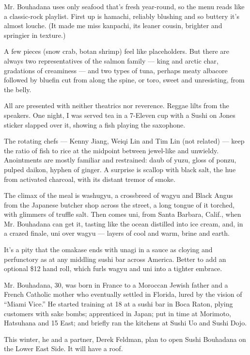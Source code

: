 Mr. Bouhadana uses only seafood that's fresh year-round, so the menu
reads like a classic-rock playlist. First up is hamachi, reliably
blushing and so buttery it's almost louche. (It made me miss kanpachi,
its leaner cousin, brighter and springier in texture.)

A few pieces (snow crab, botan shrimp) feel like placeholders. But there
are always two representatives of the salmon family --- king and arctic
char, gradations of creaminess --- and two types of tuna, perhaps meaty
albacore followed by bluefin cut from along the spine, or toro, sweet
and unresisting, from the belly.

All are presented with neither theatrics nor reverence. Reggae lilts
from the speakers. One night, I was served tea in a 7-Eleven cup with a
Sushi on Jones sticker slapped over it, showing a fish playing the
saxophone.

The rotating chefs --- Kenny Jiang, Weiqi Lin and Tim Lin (not related)
--- keep the ratio of fish to rice at the midpoint between jewel-like
and unwieldy. Anointments are mostly familiar and restrained: daub of
yuzu, gloss of ponzu, pulped daikon, hyphen of ginger. A surprise is
scallop with black salt, the hue from activated charcoal, with its
distant tremor of smoke.

The climax of the meal is washugyu, a crossbreed of wagyu and Black
Angus from the Japanese butcher shop across the street, a long tongue of
it torched, with glimmers of truffle salt. Then comes uni, from Santa
Barbara, Calif., when Mr. Bouhadana can get it, tasting like the ocean
distilled into ice cream, and, in a crazed finale, uni over wagyu ---
layers of cool and warm, brine and earth.

It's a pity that the omakase ends with unagi in a sauce as cloying and
perfunctory as at any middling sushi bar across America. Better to add
an optional \$12 hand roll, which furls wagyu and uni into a tighter
embrace.

Mr. Bouhadana, 30, was born in France to a Moroccan Jewish father and a
French Catholic mother who eventually settled in Florida, lured by the
vision of ``Miami Vice.'' He started training at 18 at a sushi bar in
Boca Raton, plying customers with sake bombs; apprenticed in Japan; put
in time at Morimoto, Hatsuhana and 15 East; and briefly ran the kitchens
at Sushi Uo and Sushi Dojo.

This winter, he and a partner, Derek Feldman, plan to open Sushi
Bouhadana on the Lower East Side. It will have a roof.

